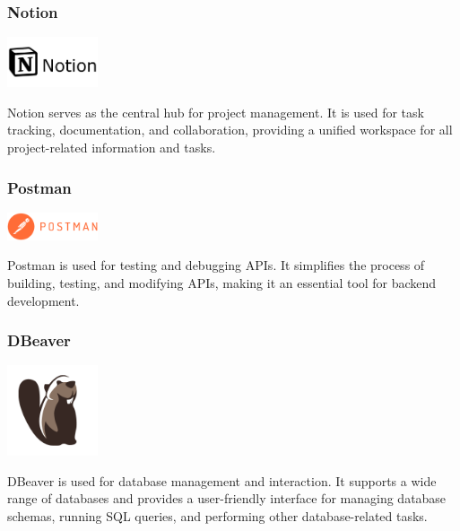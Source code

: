 \subsubsection{Notion}
\begin{center}
\includegraphics[width=0.2\textwidth]{Images/logos/62cc159e150d5de9a3dad5ec.png}
\label{fig:notion}
\end{center}
Notion serves as the central hub for project management. It is used for task tracking, documentation, and collaboration, providing a unified workspace for all project-related information and tasks.

\subsubsection{Postman}
\begin{center}
\includegraphics[width=0.2\textwidth]{Images/logos/62cc1b6b150d5de9a3dad5f9.png}
\label{fig:postman}
\end{center}
Postman is used for testing and debugging APIs. It simplifies the process of building, testing, and modifying APIs, making it an essential tool for backend development.

\subsubsection{DBeaver}
\begin{center}
\includegraphics[width=0.2\textwidth]{Images/logos/DBeaver_logo.png}
\label{fig:dbeaver}
\end{center}
DBeaver is used for database management and interaction. It supports a wide range of databases and provides a user-friendly interface for managing database schemas, running SQL queries, and performing other database-related tasks.

